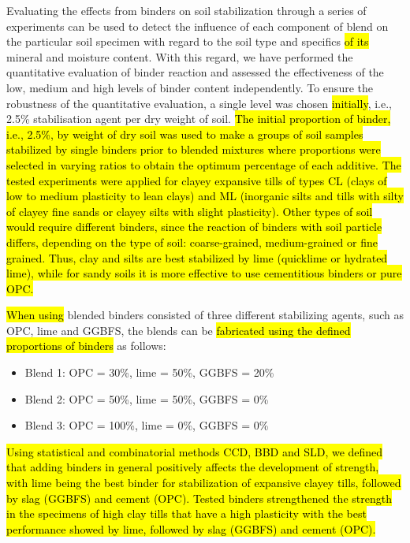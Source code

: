 \documentclass[eprint,
]{actapoly}
\begin{document}
Evaluating the effects from binders on soil stabilization through a series of experiments can be used to detect the influence of each component of blend on the particular soil specimen with regard to the soil type and specifics\hl{ of its }mineral and moisture content. With this regard, we have performed the quantitative evaluation of binder reaction and assessed the effectiveness of the low, medium and high levels of binder content independently. To ensure the robustness of the quantitative evaluation, a single level was chosen \hl{initially}, i.e., 2.5\% stabilisation agent per dry weight of soil. \hl{The initial proportion of binder, i.e., 2.5\%, by weight of dry soil was used to make a groups of soil samples stabilized by single binders prior to blended mixtures where proportions were selected in varying ratios to obtain the optimum percentage of each additive. The tested experiments were applied for clayey expansive tills of types CL (clays of low to medium plasticity to lean clays) and ML (inorganic silts and tills with silty of clayey fine sands or clayey silts with slight plasticity). Other types of soil would require different binders, since the reaction of binders with soil particle differs, depending on the type of soil: coarse-grained, medium-grained or fine grained. Thus, clay and silts are best stabilized by lime (quicklime or hydrated lime), while for sandy soils it is more effective to use cementitious binders or pure OPC.}

\hl{ When using }blended binders\hl{ }consisted of three different stabilizing agents, such as OPC, lime and GGBFS, the blends can be\hl{ fabricated using the defined proportions of binders }as follows:

\begin{itemize}
	\item [--] Blend 1: OPC = 30\%, lime = 50\%, GGBFS = 20\%
	\item [--] Blend 2: OPC = 50\%, lime = 50\%, GGBFS = 0\%
	\item [--] Blend 3: OPC = 100\%, lime = 0\%, GGBFS = 0\%
\end{itemize}

\hl{Using statistical and combinatorial methods CCD, BBD and SLD, we defined that adding binders in general positively affects the development of strength, with lime being the best binder for stabilization of expansive clayey tills, followed by slag (GGBFS) and cement (OPC). Tested binders strengthened the strength in the specimens of high clay tills that have a high plasticity with the best performance showed by lime, followed by slag (GGBFS) and cement (OPC). }
\end{document}
